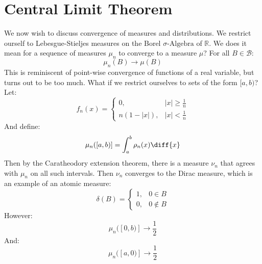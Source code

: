         \section{Central Limit Theorem}
            We now wish to discuss convergence of measures and
            distributions. We restrict ourself to
            Lebesgue-Stieljes measures on the Borel
            $\sigma\textrm{-Algebra}$ of $\mathbb{R}$. We does it
            mean for a sequence of measures $\mu_{n}$ to converge
            to a measure $\mu$? For all $B\in\mathcal{B}$:
            \begin{equation}
                \mu_{n}(B)\rightarrow\mu(B)
            \end{equation}
            This is reminiscent of point-wise convergence of functions
            of a real variable, but turns out to be too much. What if
            we restrict ourselves to sets of the form $[a,b)$? Let:
            \begin{equation}
                f_{n}(x)=
                    \begin{cases}
                        0,&|x|\geq\frac{1}{n}\\
                        n(1-|x|),&|x|<\frac{1}{n}
                    \end{cases}
            \end{equation}
            And define:
            \begin{equation}
                \mu_{n}([a,b)]=\int_{a}^{b}\rho_{n}(x)\diff{x}
            \end{equation}
            Then by the Caratheodory extension theorem, there is a
            measure $\nu_{n}$ that agrees with $\mu_{n}$ on all
            such intervals. Then $\nu_{n}$ converges to the
            Dirac measure, which is an example of an atomic measure:
            \begin{equation}
                \delta(B)=
                    \begin{cases}
                        1,&0\in{B}\\
                        0,&0\notin{B}
                    \end{cases}
            \end{equation}
            However:
            \begin{equation}
                \mu_{n}([0,b)]\rightarrow\frac{1}{2}
            \end{equation}
            And:
            \begin{equation}
                \mu_{n}([a,0)]\rightarrow\frac{1}{2}
            \end{equation}
